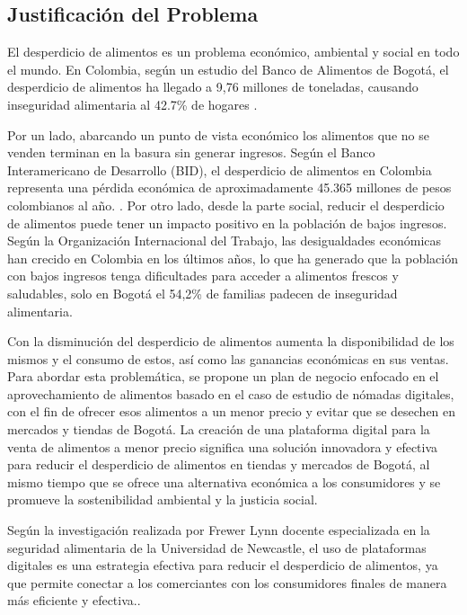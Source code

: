 \subsection{Justificación del Problema}
El desperdicio de alimentos es un problema económico, ambiental y social en todo el mundo. En Colombia, según un estudio del Banco de Alimentos de Bogotá, el desperdicio de alimentos ha llegado a 9,76 millones de toneladas, causando inseguridad alimentaria al 42.7\% de hogares \cite{BancoAlBogt}.

Por un lado, abarcando un punto de vista económico los alimentos que no se venden terminan en la basura sin generar ingresos. Según el Banco Interamericano de Desarrollo (BID), el desperdicio de alimentos en Colombia representa una pérdida económica de aproximadamente 45.365 millones de pesos colombianos al año.\cite{BID} . Por otro lado, desde la parte social, reducir el desperdicio de alimentos puede tener un impacto positivo en la población de bajos ingresos. Según la Organización Internacional del Trabajo, las desigualdades económicas han crecido en Colombia en los últimos años, lo que ha generado que la población con bajos ingresos tenga dificultades para acceder a alimentos frescos y saludables, solo en Bogotá el 54,2\% de familias padecen de inseguridad alimentaria.\cite{OIT}

Con la disminución del desperdicio de alimentos aumenta la disponibilidad de los mismos y el consumo de estos, así como las ganancias económicas en sus ventas.  
Para abordar esta problemática, se propone un plan de negocio enfocado en el aprovechamiento de alimentos basado en el caso de estudio de nómadas digitales, con el fin de ofrecer esos alimentos a un menor precio y evitar que se desechen en mercados y tiendas de Bogotá. La creación de una plataforma digital para la venta de alimentos a menor precio significa una solución innovadora y efectiva para reducir el desperdicio de alimentos en tiendas y mercados de Bogotá, al mismo tiempo que se ofrece una alternativa económica a los consumidores y se promueve la sostenibilidad ambiental y la justicia social.

Según la investigación realizada por Frewer Lynn docente especializada en la seguridad alimentaria de la Universidad de Newcastle, el uso de plataformas digitales es una estrategia efectiva para reducir el desperdicio de alimentos, ya que permite conectar a los comerciantes con los consumidores finales de manera más eficiente y efectiva.\cite{FoodScience&Tecnology}. 
